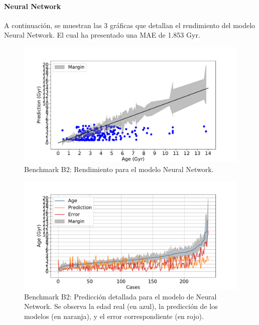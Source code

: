 \paragraph{Neural Network} 
A continuación, se muestran las 3 gráficas que detallan el rendimiento del modelo Neural Network. El cual ha presentado una MAE de 1.853 Gyr.

\begin{figure}[H]
\begin{center}
 \includegraphics[width=0.8\linewidth]{Figuras/Experimentos/B_B2_nnet_1.pdf}
\end{center}
\caption{Benchmark B2: Rendimiento para el modelo Neural Network.}
 \label{fig:benchB2_details_nnet_1}
\end{figure}

\begin{figure}[H]
\begin{center}
 \includegraphics[width=0.8\linewidth]{Figuras/Experimentos/B_B2_nnet_2.pdf}
\end{center}
\caption{Benchmark B2: Predicción detallada para el modelo de Neural Network. Se observa la edad real (en azul), la predicción de los modelos (en naranja), y el error correspondiente (en rojo).}
 \label{fig:benchB2_details_nnet_2}
\end{figure}

